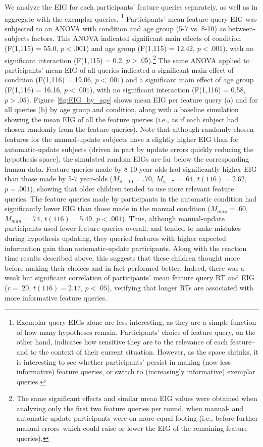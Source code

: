 \documentclass[man,floatsintext]{apa6}
\begin{document}
We analyze the EIG for each participants' feature queries separately, as well as in aggregate with the exemplar queries.
\footnote{Exemplar query EIGs alone are less interesting, as they are a simple function of how many hypotheses 
remain. Participants' choice of feature query, on the other hand, indicates how 
sensitive they are to the relevance of each feature--and to the context of their 
current situation. However, as the space shrinks, it is interesting to see whether participants' persist in making (now less informative) feature queries, or switch to (increasingly informative) exemplar queries.} 
Participants' mean feature query EIG was 
subjected to an ANOVA with condition and age group (5-7 vs. 8-10) as between-subjects factors. 
This ANOVA indicated significant main effects of condition (F(1,115) = 55.0, $p<.001$) 
and age group (F(1,115) = 12.42, $p<.001$), with no significant interaction (F(1,115) = 0.2, $p>.05$).\footnote{The same significant effects and similar mean EIG values were obtained when analyzing only the first two feature queries per round, when manual- and automatic-update participants were on more equal footing (i.e., before further manual errors--which could raise or lower the EIG of the remaining feature queries).}
The same ANOVA applied to participants' mean EIG of all queries indicated a significant main effect of condition (F(1,116) = 19.06, $p< .001$) and a significant main effect of age group (F(1,116) = 16.16, $p<.001$), with no significant interaction (F(1,116) = 0.58, $p>.05$).
Figure~\ref{fig:EIG_by_age} shows mean EIG per feature query (a) and for all queries (b) by age group and condition, along with a baseline simulation showing the mean EIG of all the feature queries (i.e., as if each subject had chosen randomly from the feature queries). Note that although randomly-chosen features for the manual-update subjects have a slightly higher EIG than for automatic-update subjects (driven in part by update errors quickly reducing the hypothesis space), the simulated random EIGs are far below the corresponding human data.
Feature queries made by 8-10 year-olds had significantly higher EIG than those made by 5-7 year-olds ($M_{8-10} = .70$, $M_{5-7} = .64$, $t(116) = 2.62$,  $p=.001$), showing that older children tended to use more relevant feature queries.
The feature queries made by participants in the 
automatic condition had significantly lower EIG than those made in the manual 
condition ($M_{auto} = .60$, $M_{man} = .74$, $t(116) = 5.49$,  $p<.001$). Thus, 
although manual-update participants used fewer feature queries overall, and tended 
to make mistakes during hypothesis updating, they
queried features with higher expected information gain than automatic-update 
participants. Along with the reaction time results described above, this suggests that these children 
thought more before making their choices and in fact performed better.  Indeed, there was a weak but significant 
correlation of participants' mean feature query RT and EIG ($r=.20$, $t(116)=2.17$, $p<.05$), verifying that longer 
RTs are associated with more informative feature queries.
\end{document}
